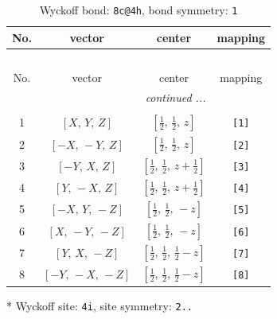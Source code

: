 \documentclass[fleqn,8pt]{jsarticle}
\begin{document}
\renewcommand{\arraystretch}{1.2}
\begin{longtable}{cccc}
\caption{Wyckoff bond: {\tt 8c@4h}, bond symmetry: {\tt 1}}
 \\
 \hline \hline
No. & vector & center & mapping \\ \hline \endfirsthead

\multicolumn{3}{l}{\tablename\ \thetable{}} \\
 \hline \hline
No. & vector & center & mapping \\ \hline \endhead

 \hline \hline
\multicolumn{3}{r}{\footnotesize\it continued ...} \\ \endfoot

 \hline \hline
\multicolumn{3}{r}{} \\ \endlastfoot

1 & $\left[ X,\, Y,\, Z \right]$ & $\left[ \frac{1}{2},\, \frac{1}{2},\, z \right]$ & {\tt [1]} \\ \hline
2 & $\left[ - X,\, - Y,\, Z \right]$ & $\left[ \frac{1}{2},\, \frac{1}{2},\, z \right]$ & {\tt [2]} \\ \hline
3 & $\left[ - Y,\, X,\, Z \right]$ & $\left[ \frac{1}{2},\, \frac{1}{2},\, z + \frac{1}{2} \right]$ & {\tt [3]} \\ \hline
4 & $\left[ Y,\, - X,\, Z \right]$ & $\left[ \frac{1}{2},\, \frac{1}{2},\, z + \frac{1}{2} \right]$ & {\tt [4]} \\ \hline
5 & $\left[ - X,\, Y,\, - Z \right]$ & $\left[ \frac{1}{2},\, \frac{1}{2},\, - z \right]$ & {\tt [5]} \\ \hline
6 & $\left[ X,\, - Y,\, - Z \right]$ & $\left[ \frac{1}{2},\, \frac{1}{2},\, - z \right]$ & {\tt [6]} \\ \hline
7 & $\left[ Y,\, X,\, - Z \right]$ & $\left[ \frac{1}{2},\, \frac{1}{2},\, \frac{1}{2} - z \right]$ & {\tt [7]} \\ \hline
8 & $\left[ - Y,\, - X,\, - Z \right]$ & $\left[ \frac{1}{2},\, \frac{1}{2},\, \frac{1}{2} - z \right]$ & {\tt [8]} \\
\end{longtable}
* Wyckoff site: {\tt 4i}, site symmetry: {\tt 2..}
\renewcommand{\arraystretch}{1.2}
\end{document}
